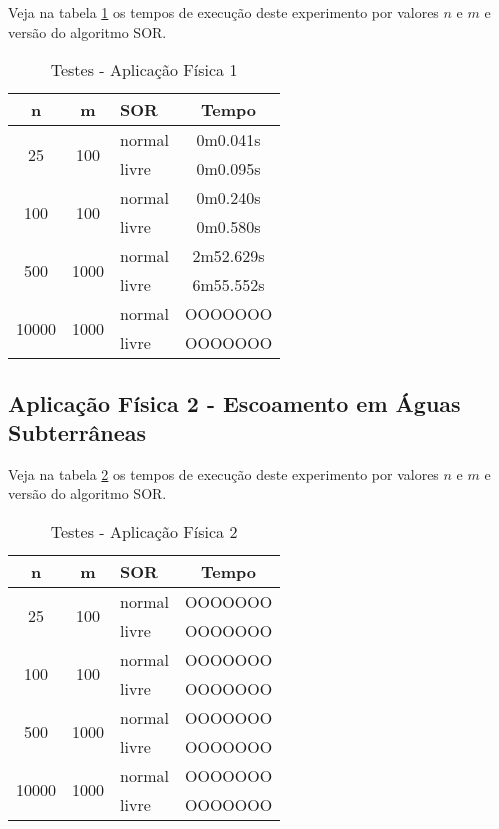 \documentclass[
	11pt,				%
	oneside,			%
	a4paper,			%
	english,			%
	brazil,				%
	]{article}
\begin{document}
Veja na tabela \ref{tab:taf1} os tempos de execução deste experimento por 
valores $n$ e $m$ e versão do algoritmo SOR.

\begin{table}[ht]
\centering
\begin{tabular}{|c|c|l|c|}
\hline 
\textbf{n} & \textbf{m} & \textbf{SOR} & \textbf{Tempo} \\
\hline
\multirow{2}{*}{25}    & \multirow{2}{*}{100}  & normal & 0m0.041s \\
                       &                       & livre  & 0m0.095s \\
\hline
\multirow{2}{*}{100}   & \multirow{2}{*}{100}  & normal & 0m0.240s \\
                       &                       & livre  & 0m0.580s \\
\hline
\multirow{2}{*}{500}   & \multirow{2}{*}{1000} & normal & 2m52.629s \\
                       &                       & livre  & 6m55.552s \\
\hline
\multirow{2}{*}{10000} & \multirow{2}{*}{1000} & normal & OOOOOOO \\
                       &                       & livre  & OOOOOOO \\
\hline
\end{tabular}
\caption{Testes - Aplicação Física 1}
\label{tab:taf1}
\end{table}

\subsection{Aplicação Física 2 - Escoamento em Águas Subterrâneas}
\lipsum[9]

Veja na tabela \ref{tab:taf2} os tempos de execução deste experimento por 
valores $n$ e $m$ e versão do algoritmo SOR.

\begin{table}[ht]
\centering
\begin{tabular}{|c|c|l|c|}
\hline 
\textbf{n} & \textbf{m} & \textbf{SOR} & \textbf{Tempo} \\
\hline
\multirow{2}{*}{25}    & \multirow{2}{*}{100}  & normal & OOOOOOO \\
                       &                       & livre  & OOOOOOO \\
\hline
\multirow{2}{*}{100}   & \multirow{2}{*}{100}  & normal & OOOOOOO \\
                       &                       & livre  & OOOOOOO \\
\hline
\multirow{2}{*}{500}   & \multirow{2}{*}{1000} & normal & OOOOOOO \\
                       &                       & livre  & OOOOOOO \\
\hline
\multirow{2}{*}{10000} & \multirow{2}{*}{1000} & normal & OOOOOOO \\
                       &                       & livre  & OOOOOOO \\
\hline
\end{tabular}
\caption{Testes - Aplicação Física 2}
\label{tab:taf2}
\end{table}
\end{document}
